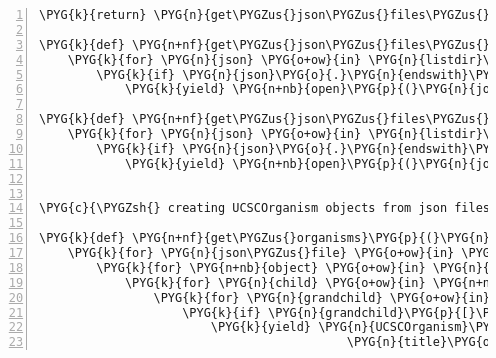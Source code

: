 \begin{Verbatim}[commandchars=\\\{\},numbers=left,firstnumber=1,stepnumber=5]
    \PYG{k}{return} \PYG{n}{get\PYGZus{}json\PYGZus{}files\PYGZus{}web}

\PYG{k}{def} \PYG{n+nf}{get\PYGZus{}json\PYGZus{}files\PYGZus{}cache}\PYG{p}{(}\PYG{p}{)}\PYG{p}{:}
    \PYG{k}{for} \PYG{n}{json} \PYG{o+ow}{in} \PYG{n}{listdir}\PYG{p}{(}\PYG{n}{org\PYGZus{}list\PYGZus{}cache\PYGZus{}dir}\PYG{p}{)}\PYG{p}{:}
        \PYG{k}{if} \PYG{n}{json}\PYG{o}{.}\PYG{n}{endswith}\PYG{p}{(}\PYG{l+s}{"}\PYG{l+s}{.json}\PYG{l+s}{"}\PYG{p}{)}\PYG{p}{:}
            \PYG{k}{yield} \PYG{n+nb}{open}\PYG{p}{(}\PYG{n}{join}\PYG{p}{(}\PYG{n}{org\PYGZus{}list\PYGZus{}cache\PYGZus{}dir}\PYG{p}{,} \PYG{n}{json}\PYG{p}{)}\PYG{p}{)}

\PYG{k}{def} \PYG{n+nf}{get\PYGZus{}json\PYGZus{}files\PYGZus{}default}\PYG{p}{(}\PYG{p}{)}\PYG{p}{:}
    \PYG{k}{for} \PYG{n}{json} \PYG{o+ow}{in} \PYG{n}{listdir}\PYG{p}{(}\PYG{n}{org\PYGZus{}list\PYGZus{}default\PYGZus{}dir}\PYG{p}{)}\PYG{p}{:}
        \PYG{k}{if} \PYG{n}{json}\PYG{o}{.}\PYG{n}{endswith}\PYG{p}{(}\PYG{l+s}{"}\PYG{l+s}{.json}\PYG{l+s}{"}\PYG{p}{)}\PYG{p}{:}
            \PYG{k}{yield} \PYG{n+nb}{open}\PYG{p}{(}\PYG{n}{join}\PYG{p}{(}\PYG{n}{org\PYGZus{}list\PYGZus{}default\PYGZus{}dir}\PYG{p}{,} \PYG{n}{json}\PYG{p}{)}\PYG{p}{)}


\PYG{c}{\PYGZsh{} creating UCSCOrganism objects from json files}

\PYG{k}{def} \PYG{n+nf}{get\PYGZus{}organisms}\PYG{p}{(}\PYG{n}{json\PYGZus{}files}\PYG{p}{)}\PYG{p}{:}
    \PYG{k}{for} \PYG{n}{json\PYGZus{}file} \PYG{o+ow}{in} \PYG{n}{json\PYGZus{}files}\PYG{p}{:}
        \PYG{k}{for} \PYG{n+nb}{object} \PYG{o+ow}{in} \PYG{n}{load}\PYG{p}{(}\PYG{n}{json\PYGZus{}file}\PYG{p}{)}\PYG{p}{:}
            \PYG{k}{for} \PYG{n}{child} \PYG{o+ow}{in} \PYG{n+nb}{object}\PYG{p}{[}\PYG{l+s}{'}\PYG{l+s}{children}\PYG{l+s}{'}\PYG{p}{]}\PYG{p}{:}
                \PYG{k}{for} \PYG{n}{grandchild} \PYG{o+ow}{in} \PYG{n}{child}\PYG{p}{[}\PYG{l+s}{'}\PYG{l+s}{children}\PYG{l+s}{'}\PYG{p}{]}\PYG{p}{:}
                    \PYG{k}{if} \PYG{n}{grandchild}\PYG{p}{[}\PYG{l+s}{'}\PYG{l+s}{attr}\PYG{l+s}{'}\PYG{p}{]}\PYG{p}{[}\PYG{l+s}{'}\PYG{l+s}{rel}\PYG{l+s}{'}\PYG{p}{]} \PYG{o}{==} \PYG{l+s}{'}\PYG{l+s}{genome}\PYG{l+s}{'}\PYG{p}{:}
                        \PYG{k}{yield} \PYG{n}{UCSCOrganism}\PYG{p}{(}\PYG{n}{db}\PYG{o}{=}\PYG{n}{grandchild}\PYG{p}{[}\PYG{l+s}{'}\PYG{l+s}{attr}\PYG{l+s}{'}\PYG{p}{]}\PYG{p}{[}\PYG{l+s}{'}\PYG{l+s}{id}\PYG{l+s}{'}\PYG{p}{]}\PYG{p}{,}
                                           \PYG{n}{title}\PYG{o}{=}\PYG{n}{grandchild}\PYG{p}{[}\PYG{l+s}{'}\PYG{l+s}{data}\PYG{l+s}{'}\PYG{p}{]}\PYG{p}{[}\PYG{l+s}{'}\PYG{l+s}{title}\PYG{l+s}{'}\PYG{p}{]}\PYG{p}{)}
\end{Verbatim}


